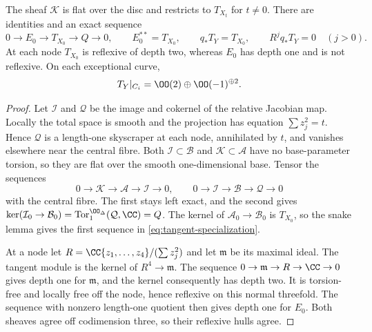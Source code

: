 \begin{proposition}\label{prop:tangent-sheaf}
The sheaf $\mathcal K$ is flat over the disc and restricts to $T_{X_t}$
for $t\ne0$. There are identities and an exact sequence
\begin{equation}\label{eq:tangent-specialization}
 0\to E_0\to T_{X_0}\to Q\to0,\qquad
 E_0^{**}=T_{X_0},\qquad q_*T_Y=T_{X_0},\qquad
 R^jq_*T_Y=0\quad(j>0).
\end{equation}
At each node $T_{X_0}$ is reflexive of depth two, whereas $E_0$ has
depth one and is not reflexive. On each exceptional curve,
\begin{equation}\label{eq:tangent-splitting}
 T_Y|_{C_i}=\OO(2)\oplus\OO(-1)^{\oplus2}.
\end{equation}
\end{proposition}
\begin{proof}
Let $\mathcal I$ and $\mathcal Q$ be the image and cokernel of the
relative Jacobian map. Locally the total space is smooth and the
projection has equation $\sum z_j^2=t$. Hence $\mathcal Q$ is a
length-one skyscraper at each node, annihilated by $t$, and vanishes
elsewhere near the central fibre. Both $\mathcal I\subset\mathcal B$
and $\mathcal K\subset\mathcal A$ have no base-parameter torsion,
so they are flat over the smooth one-dimensional base. Tensor the
sequences
\[
 0\to\mathcal K\to\mathcal A\to\mathcal I\to0,
 \qquad 0\to\mathcal I\to\mathcal B\to\mathcal Q\to0
\]
with the central fibre. The first stays left exact, and the second
gives $\ker(\mathcal I_0\to\mathcal B_0)=
\operatorname{Tor}_1^{\OO_\Delta}(\mathcal Q,\CC)=Q$.
The kernel of $\mathcal A_0\to\mathcal B_0$ is $T_{X_0}$, so the
snake lemma gives the first sequence in \eqref{eq:tangent-specialization}.

At a node let $R=\CC\{z_1,\ldots,z_4\}/(\sum z_j^2)$ and let
$\mathfrak m$ be its maximal ideal. The tangent module is the kernel
of $R^4\to\mathfrak m$. The sequence
$0\to\mathfrak m\to R\to\CC\to0$ gives depth one for $\mathfrak m$,
and the kernel consequently has depth two. It is torsion-free and
locally free off the node, hence reflexive on this normal threefold.
The sequence with nonzero length-one quotient then gives depth one
for $E_0$. Both sheaves agree off codimension three, so their reflexive
hulls agree.


\end{proof}
